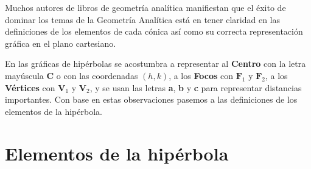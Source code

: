 \documentclass[12pt,a4paper]{article}
\begin{document}
	\bigskip

	Muchos autores de libros de geometría analítica manifiestan que el éxito de dominar los temas de la Geometría Analítica está en tener claridad en las definiciones de los elementos de cada cónica así como su correcta representación gráfica en el plano cartesiano.

	\bigskip

	En las gráficas de hipérbolas se acostumbra a representar al \textbf{Centro} con la letra mayúscula \textbf{C} o con las coordenadas \textbf{$(h,k)$}, a los \textbf{Focos} con $\textbf{F}_1$ y $\textbf{F}_2$, a los \textbf{Vértices} con $\textbf{V}_1$ y $\textbf{V}_2$, y se usan las letras \textbf{a}, \textbf{b} y \textbf{c} para representar distancias importantes. Con base en estas observaciones pasemos a las definiciones de los elementos de la hipérbola.

	\section{Elementos de la hipérbola}
\end{document}
